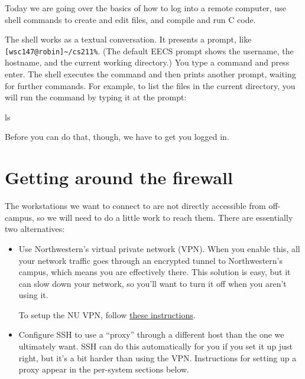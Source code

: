 \documentclass{tufte-handout}
\def\GlobalProtectUrl{https://kb.northwestern.edu/page.php?id=94726}
\begin{document}
\maketitle

Today we are going over the basics of how to log into a remote computer,
use shell commands to create and edit files, and compile and run C code.

The shell works as a textual conversation. It presents a prompt, like
\verb![wsc147@robin]~/cs211%!. (The default EECS prompt shows the
username, the hostname, and the current working directory.) You type a
command and press enter. The shell executes the command and then prints
another prompt, waiting for further commands. For example, to list the
files in the current directory, you will run the  command
by typing it at the prompt:

\begin{CmdLine*}
  \C ls \\
\end{CmdLine*}


\noindent
Before you can do that, though, we have to get you logged in.

\section{Getting around the firewall}

The workstations we want to connect to are not directly accessible from
off-campus, so we will need to do a little work to reach them. There are
essentially two alternatives:

\begin{itemize}

  \item Use Northwestern’s virtual private network (VPN). When you
    enable this, all your network traffic goes through an encrypted
    tunnel to Northwestern’s campus, which means you are effectively
    there. This solution is easy, but it can slow down your network, so
    you’ll want to turn it off when you aren’t using it.

    To setup the NU VPN, follow \href{\GlobalProtectUrl}{these
    instructions}.

  \item Configure SSH to use a ``proxy'' through a different host than
    the one we ultimately want. SSH can do this automatically for you if
    you set it up just right, but it’s a bit harder than using the VPN.
    Instructions for setting up a proxy appear in the per-system
    sections below.

\end{itemize}
\end{document}
